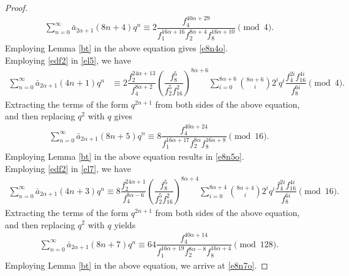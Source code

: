 \documentclass[11pt,a4paper]{article}
\numberwithin{equation}{section}
\theoremstyle{plain}
\begin{document}
\begin{proof}
			\begin{align*}
			\sum_{n=0}^{\infty}\bar{a}_{2\alpha+1}(8n+4)q^n\equiv 2\dfrac{f_4^{40\alpha+29}}{f_1^{16\alpha+16}f_2^{8\alpha+4}f_8^{16\alpha+10}}\pmod 4.
			\end{align*}
			Employing Lemma \ref{bt} in the above equation gives \eqref{e8n4o}.\\
		\indent	Employing \eqref{edf2} in \eqref{el5}, we have
			\begin{align*}
			\sum_{n=0}^{\infty}\bar{a}_{2\alpha+1}(4n+1)q^n&\equiv 2\dfrac{f_2^{24\alpha+13}}{f_4^{8\alpha+2}}\left(\dfrac{f_8^5}{f_2^5f_{16}^2}\right)^{8\alpha+6}\sum_{i=0}^{8\alpha+6}\binom{8\alpha+6}{i}2^iq^i\dfrac{f_4^{2i}f_{16}^{4i}}{f_8^{6i}}\pmod 4.
			\end{align*}
			Extracting the terms of the form $q^{2n+1}$ from both sides of the above equation, and then replacing $q^{2}$ with $q$ gives
			\begin{align*}
			\sum_{n=0}^{\infty}\bar{a}_{2\alpha+1}(8n+5)q^n\equiv 8 \dfrac{f_4^{40\alpha+24}}{f_1^{16\alpha+17}f_2^{8\alpha}f_8^{16\alpha+8}}\pmod{16}.
			\end{align*}
			Employing Lemma \ref{bt} in the above equation results in \eqref{e8n5o}.\\
			\indent Employing \eqref{edf2} in \eqref{el7}, we have
			\begin{align*}
			\sum_{n=0}^{\infty}\bar{a}_{2\alpha+1}(4n+3)q^n\equiv 8\dfrac{f_2^{24\alpha+1}}{f_4^{8\alpha-6}}\left(\dfrac{f_8^5}{f_2^5f_{16}^2}\right)^{8\alpha+4}\sum_{i=0}^{8\alpha+4}\binom{8\alpha+4}{i}2^iq^i\dfrac{f_4^{2i}f_{16}^{4i}}{f_8^{6i}}\pmod{16}.
			\end{align*}
			Extracting the terms of the form $q^{2n+1}$ from both sides of the above equation, and then replacing $q^{2}$ with $q$ yields
			\begin{align*}
			\sum_{n=0}^{\infty}\bar{a}_{2\alpha+1}(8n+7)q^n\equiv 64\dfrac{f_4^{40\alpha+14}}{f_1^{16\alpha+19}f_2^{8\alpha-8}f_8^{16\alpha+4}}\pmod{128}.
			\end{align*}
			Employing Lemma \ref{bt} in the above equation, we arrive at \eqref{e8n7o}.
	\end{proof}
\end{document}

